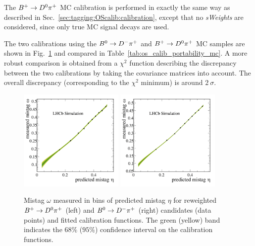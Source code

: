 The $B^+\rightarrow D^0\pi^+$ MC calibration is performed in exactly the same way as described in Sec.~\ref{sec:tagging:OScalib:calibration}, except that no
\emph{sWeights} are considered, since only true MC signal decays are used.

The two calibrations using the $B^0\rightarrow D^-\pi^+$ and $B^+\rightarrow D^0\pi^+$ MC samples are shown in Fig.~\ref{fig:os_calib_portability_mc} and compared in Table~\ref{tab:os_calib_portability_mc}. A more robust comparison is obtained from a $\chi^2$ function describing the discrepancy between the two calibrations by taking the covariance matrices into account. The overall discrepancy (corresponding to the $\chi^2$ minimum) is around $2~\sigma$.

\begin{figure}[t!]
        \begin{center}
                \includegraphics[width=0.45\textwidth]{04Flavourtagging/figs/OS_Combination_Calibration_Bu_MC.png}
                \includegraphics[width=0.45\textwidth]{04Flavourtagging/figs/OS_Combination_Calibration_Bd_MC.png}
        \end{center}
        \vspace{-5mm}
        \caption{Mistag $\omega$ measured in bins of predicted mistag $\eta$ for reweighted $B^+\rightarrow D^0\pi^+$ (left) and $B^0\rightarrow D^-\pi^+$ (right) candidates (data points) and fitted calibration functions. The green (yellow) band indicates the $68\%$ ($95\%$) confidence interval on the calibration functions.}
        \label{fig:os_calib_portability_mc}
\end{figure}

